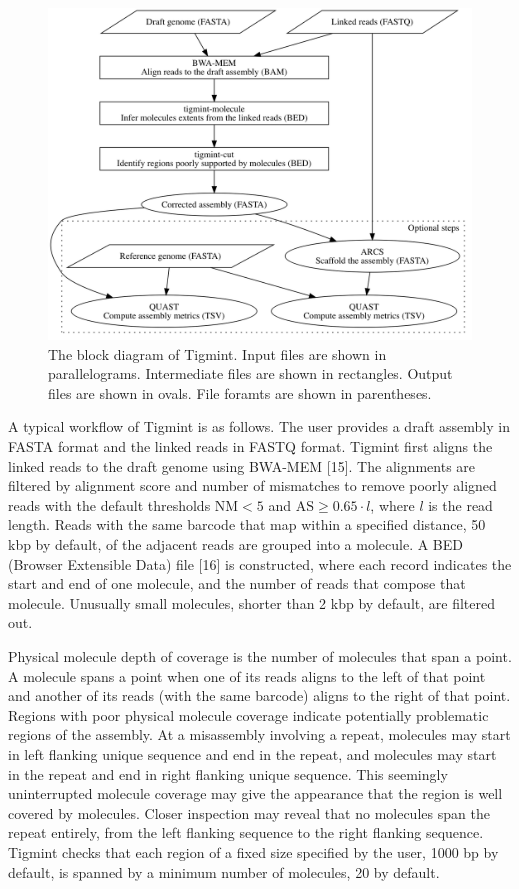 \documentclass{bmcart}
\begin{document}
\begin{figure}[!htbp]
\hypertarget{fig:pipeline}{%
\centering
\includegraphics[width=4.8in]{figures/pipeline.png}
\caption{The block diagram of Tigmint. Input files are shown in parallelograms. Intermediate files are shown in rectangles. Output files are shown in ovals. File foramts are shown in parentheses.}\label{fig:pipeline}
}
\end{figure}

A typical workflow of Tigmint is as follows. The user provides a draft assembly in FASTA format and the linked reads in FASTQ format. Tigmint first aligns the linked reads to the draft genome using BWA-MEM {[}15{]}. The alignments are filtered by alignment score and number of mismatches to remove poorly aligned reads with the default thresholds \(\textrm{NM} < 5\) and \(\textrm{AS} \geq 0.65 \cdot l\), where \(l\) is the read length. Reads with the same barcode that map within a specified distance, 50 kbp by default, of the adjacent reads are grouped into a molecule. A BED (Browser Extensible Data) file {[}16{]} is constructed, where each record indicates the start and end of one molecule, and the number of reads that compose that molecule. Unusually small molecules, shorter than 2 kbp by default, are filtered out.

Physical molecule depth of coverage is the number of molecules that span a point. A molecule spans a point when one of its reads aligns to the left of that point and another of its reads (with the same barcode) aligns to the right of that point. Regions with poor physical molecule coverage indicate potentially problematic regions of the assembly. At a misassembly involving a repeat, molecules may start in left flanking unique sequence and end in the repeat, and molecules may start in the repeat and end in right flanking unique sequence. This seemingly uninterrupted molecule coverage may give the appearance that the region is well covered by molecules. Closer inspection may reveal that no molecules span the repeat entirely, from the left flanking sequence to the right flanking sequence. Tigmint checks that each region of a fixed size specified by the user, 1000 bp by default, is spanned by a minimum number of molecules, 20 by default.
\end{document}
